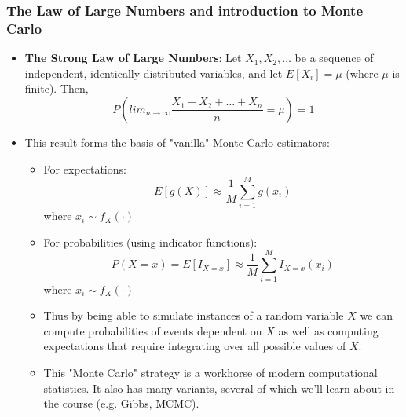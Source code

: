 \documentclass[12pt]{report}
\begin{document}
\subsubsection*{The Law of Large Numbers and introduction to Monte Carlo}
\label{sec-1-1-6}
\begin{itemize}
\item \textbf{The Strong Law of Large Numbers}: Let $X_1, X_2, \ldots$ be a sequence of
independent, identically distributed variables, and let $E[X_i]=\mu$ (where
$\mu$ is finite).  Then, $$P(lim_{n \to \infty}
  \frac{X_1+X_2+\ldots+X_n}{n} = \mu) =1 $$
\item This result forms the basis of "vanilla" Monte Carlo estimators:
\begin{itemize}
\item For expectations: $$E[g(X)] \approx \frac{1}{M}\sum_{i=1}^M g(x_i) $$ where $x_i \sim f_X(\cdot)$
\item For probabilities (using indicator functions): $$P(X=x)=E[I_{X=x}] \approx
    \frac{1}{M}\sum_{i=1}^M I_{X=x}(x_i)$$ where $x_i \sim f_X(\cdot)$
\item Thus by being able to simulate instances of a random variable $X$ we can
compute probabilities of events dependent on $X$ as well as computing
expectations that require integrating over all possible values of $X$.
\item This "Monte Carlo" strategy is a workhorse of modern computational
statistics.  It also has many variants, several of which we'll learn about in
the course (e.g. Gibbs, MCMC).
\end{itemize}
\end{itemize}
\end{document}
